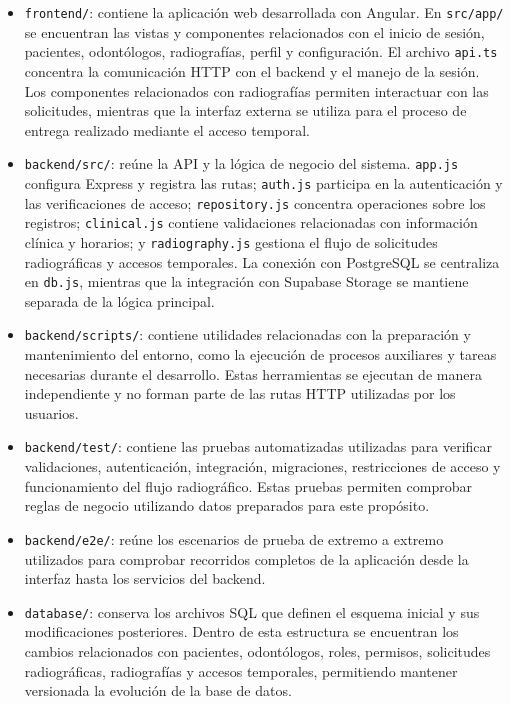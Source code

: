\begin{itemize}
	
	\item \texttt{frontend/}: contiene la aplicación web desarrollada con
	Angular. En \texttt{src/app/} se encuentran las vistas y componentes
	relacionados con el inicio de sesión, pacientes, odontólogos,
	radiografías, perfil y configuración. El archivo \texttt{api.ts}
	concentra la comunicación HTTP con el backend y el manejo de la sesión.
	Los componentes relacionados con radiografías permiten interactuar con
	las solicitudes, mientras que la interfaz externa se utiliza para el
	proceso de entrega realizado mediante el acceso temporal.
	
	\item \texttt{backend/src/}: reúne la API y la lógica de negocio del
	sistema. \texttt{app.js} configura Express y registra las rutas;
	\texttt{auth.js} participa en la autenticación y las verificaciones de
	acceso; \texttt{repository.js} concentra operaciones sobre los registros;
	\texttt{clinical.js} contiene validaciones relacionadas con información
	clínica y horarios; y \texttt{radiography.js} gestiona el flujo de
	solicitudes radiográficas y accesos temporales. La conexión con
	PostgreSQL se centraliza en \texttt{db.js}, mientras que la integración
	con Supabase Storage se mantiene separada de la lógica principal.
	
	\item \texttt{backend/scripts/}: contiene utilidades relacionadas con la
	preparación y mantenimiento del entorno, como la ejecución de procesos
	auxiliares y tareas necesarias durante el desarrollo. Estas herramientas
	se ejecutan de manera independiente y no forman parte de las rutas HTTP
	utilizadas por los usuarios.
	
	\item \texttt{backend/test/}: contiene las pruebas automatizadas utilizadas
	para verificar validaciones, autenticación, integración, migraciones,
	restricciones de acceso y funcionamiento del flujo radiográfico. Estas
	pruebas permiten comprobar reglas de negocio utilizando datos preparados
	para este propósito.
	
	\item \texttt{backend/e2e/}: reúne los escenarios de prueba de extremo a
	extremo utilizados para comprobar recorridos completos de la aplicación
	desde la interfaz hasta los servicios del backend.
	
	\item \texttt{database/}: conserva los archivos SQL que definen el esquema
	inicial y sus modificaciones posteriores. Dentro de esta estructura se
	encuentran los cambios relacionados con pacientes, odontólogos, roles,
	permisos, solicitudes radiográficas, radiografías y accesos temporales,
	permitiendo mantener versionada la evolución de la base de datos.
	

\end{itemize}
